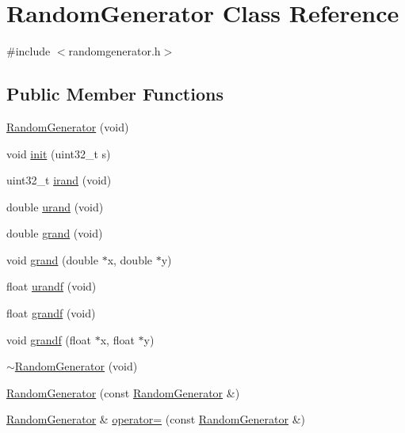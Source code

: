 \hypertarget{classRandomGenerator}{\section{\-Random\-Generator \-Class \-Reference}
\label{dc/d2b/classRandomGenerator}
}


{\ttfamily \#include $<$randomgenerator.\-h$>$}

\subsection*{\-Public \-Member \-Functions}
\begin{DoxyCompactItemize}
\item 
\hyperlink{classRandomGenerator_ad68dfb1d3d6164777c27beb1d5869873}{\-Random\-Generator} (void)
\item 
void \hyperlink{classRandomGenerator_aa8846493e3be4eb3ae33cc51acb755df}{init} (uint32\-\_\-t s)
\item 
uint32\-\_\-t \hyperlink{classRandomGenerator_ac033153cac2a8374e15a2fcd3bd97237}{irand} (void)
\item 
double \hyperlink{classRandomGenerator_a137418f98750869b00c79d416cc7912e}{urand} (void)
\item 
double \hyperlink{classRandomGenerator_ace6d52f8318a4e80efad58fe75489427}{grand} (void)
\item 
void \hyperlink{classRandomGenerator_a98dd6a2e60c0a1f3bf40cf881379a565}{grand} (double $\ast$x, double $\ast$y)
\item 
float \hyperlink{classRandomGenerator_a0f3aa91354bd76c6674459f490219227}{urandf} (void)
\item 
float \hyperlink{classRandomGenerator_a18a681f23b7e0394e169c6644f25e709}{grandf} (void)
\item 
void \hyperlink{classRandomGenerator_a2a60efdd321e5b2b8c56bee92e278c17}{grandf} (float $\ast$x, float $\ast$y)
\item 
\hyperlink{classRandomGenerator_ada0252d5def711284f6b381a3aa85b6e}{$\sim$\-Random\-Generator} (void)
\item 
\hyperlink{classRandomGenerator_a7afcfda9d0f7cab90fc701e284f43abf}{\-Random\-Generator} (const \hyperlink{classRandomGenerator}{\-Random\-Generator} \&)
\item 
\hyperlink{classRandomGenerator}{\-Random\-Generator} \& \hyperlink{classRandomGenerator_ab0ea4d9372ee731c2dac35a7089a57cc}{operator=} (const \hyperlink{classRandomGenerator}{\-Random\-Generator} \&)
\end{DoxyCompactItemize}


